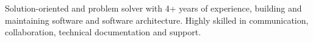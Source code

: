 \section{}
\small{Solution-oriented and problem solver with 4+ years of experience, building and maintaining software and software architecture. Highly skilled in communication, collaboration, technical documentation and support.}